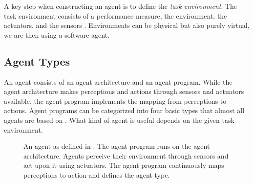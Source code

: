 \documentclass[../main.tex]{subfiles}
\begin{document}
A key step when constructing an agent is to define the \emph{task environment}.
The task environment consists of a performance measure, the environment, the actuators, and the sensors \cite{Russel2022}.
Environments can be physical but also purely virtual, we are then using a software agent.

\subsection{Agent Types}

An agent consists of an agent architecture and an agent program.
While the agent architecture makes perceptions and actions through sensors and actuators available,
the agent program implements the mapping from perceptions to actions.
Agent programs can be categorized into four basic types that almost all agents are based on \cite{Russel2022}.
What kind of agent is useful depends on the given task environment.

\begin{figure}[t]
    \centering
    \caption{An agent as defined in \autocite{Russel2022}.
        The agent program runs on the agent architecture.
        Agents perceive their environment through sensors and act upon it using actuators.
        The agent program continuously maps perceptions to action and defines the agent type.}
    \label{fig:agent_overview}
\end{figure}
\end{document}
